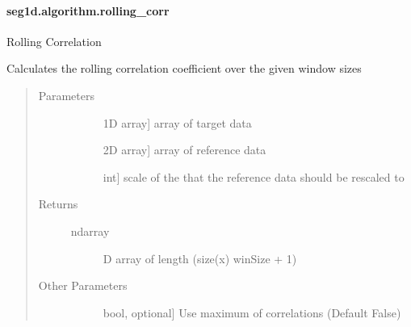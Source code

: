 \documentclass[letterpaper,10pt,english]{sphinxmanual}
\begin{document}
\paragraph{seg1d.algorithm.rolling\_corr}
\label{\detokenize{generated/seg1d.algorithm.rolling_corr:seg1d-algorithm-rolling-corr}}\label{\detokenize{generated/seg1d.algorithm.rolling_corr::doc}}

\begin{fulllineitems}
\label{\detokenize{generated/seg1d.algorithm.rolling_corr:seg1d.algorithm.rolling_corr}}
\sphinxAtStartPar
Rolling Correlation

\sphinxAtStartPar
Calculates the rolling correlation coefficient over the given window sizes
\begin{quote}\begin{description}
\item[{Parameters}] \leavevmode\begin{description}
\item[{}] \leavevmode{[}1\sphinxhyphen{}D array{]}
\sphinxAtStartPar
array of target data

\item[{}] \leavevmode{[}2\sphinxhyphen{}D array{]}
\sphinxAtStartPar
array of reference data

\item[{}] \leavevmode{[}int{]}
\sphinxAtStartPar
scale of the that the reference data should be rescaled to

\end{description}

\item[{Returns}] \leavevmode\begin{description}
\item[{ndarray}] \leavevmode
{}\sphinxhyphen{}D array of length (size(x) \sphinxhyphen{} winSize + 1)

\end{description}

\item[{Other Parameters}] \leavevmode\begin{description}
\item[{}] \leavevmode{[}bool, optional{]}
\sphinxAtStartPar
Use maximum of correlations (Default False)


\end{description}
\end{description}
\end{quote}
\end{fulllineitems}
\end{document}
